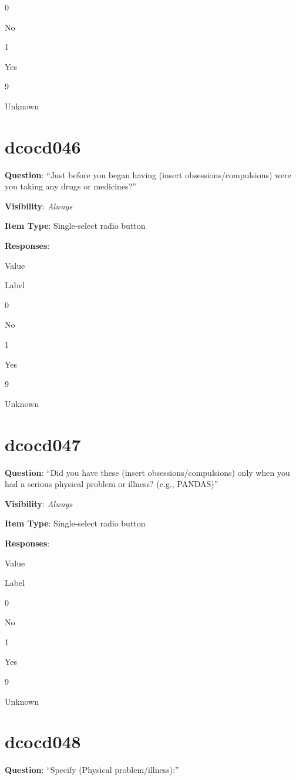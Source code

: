\documentclass[]{book}
\begin{document}
0

No

1

Yes

9

Unknown

\hypertarget{dcocd046}{%
\section{dcocd046}\label{dcocd046}}

\textbf{Question}: ``Just before you began having (insert obsessions/compulsions) were you taking any drugs or medicines?''

\textbf{Visibility}: \emph{Always}

\textbf{Item Type}: Single-select radio button

\textbf{Responses}:

Value

Label

0

No

1

Yes

9

Unknown

\hypertarget{dcocd047}{%
\section{dcocd047}\label{dcocd047}}

\textbf{Question}: ``Did you have these (insert obsessions/compulsions) only when you had a serious physical problem or illness? (e.g., PANDAS)''

\textbf{Visibility}: \emph{Always}

\textbf{Item Type}: Single-select radio button

\textbf{Responses}:

Value

Label

0

No

1

Yes

9

Unknown

\hypertarget{dcocd048}{%
\section{dcocd048}\label{dcocd048}}

\textbf{Question}: ``Specify (Physical problem/illness):''
\end{document}
